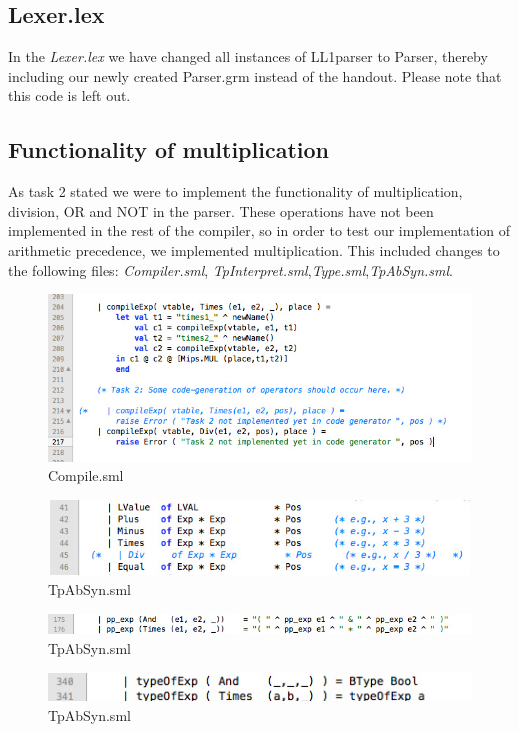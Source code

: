 \documentclass[12pt,a4paper,english]{article}
\begin{document}
\subsection{Lexer.lex}
In the \textit{Lexer.lex} we have changed all instances of LL1parser to Parser, thereby including our newly created Parser.grm instead of the handout. Please note that this code is left out.

\subsection{Functionality of multiplication}
As task 2 stated we were to implement the functionality of multiplication, division, OR and NOT in the parser. These operations have not been implemented in the rest of the compiler, so in order to test our implementation of arithmetic precedence, we implemented multiplication. This included changes to the following files: \textit{Compiler.sml},
\textit{TpInterpret.sml},\textit{Type.sml},\textit{TpAbSyn.sml}.
\begin{figure}\includegraphics[width=15cm]{compiler.jpg} \caption{Compile.sml}\end{figure}
\begin{figure}\includegraphics[width=15cm, height = 2cm]{TpAbSyn1.jpg}\caption{TpAbSyn.sml}\end{figure}
\begin{figure}\includegraphics[width=15cm]{TpAbSyn2.jpg}\caption{TpAbSyn.sml}\end{figure}
\begin{figure}\includegraphics[]{TpAbSyn3.jpg}\caption{TpAbSyn.sml}\end{figure}
\end{document}
